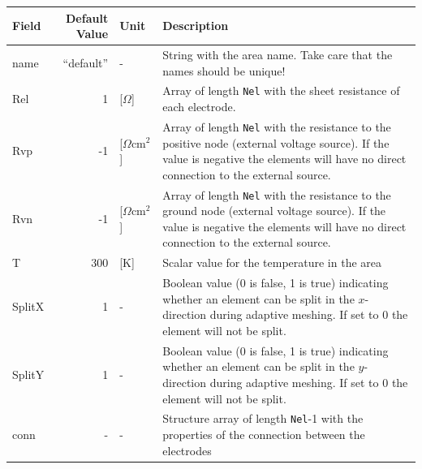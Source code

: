 \documentclass[noshowpacs,preprintnumbers,amsmath,amssymb, letter]{revtex4}
\begin{document}
\begin{table}[H]
\caption{\label{areadefstruct}The fields in the area definition struct}
\begin{longtable}{lrlp{}}
Field & Default Value & Unit & Description\\
\hline
name 	& ``default'' 	& - 						& String with the area name. Take care that the names should be unique!\\
Rel	 	&  1 			& [$\Omega$] 				& Array of length \texttt{Nel} with the sheet resistance of each electrode.\\
Rvp	 	&  -1 			& [$\Omega \text{cm}^2$] 	& Array of length \texttt{Nel} with the resistance to the positive node (external voltage source). If the value is negative the elements will have no direct connection to the external source.\\
Rvn	 	&  -1 			& [$\Omega \text{cm}^2$] 	& Array of length \texttt{Nel} with the resistance to the ground node (external voltage source). If the value is negative the elements will have no direct connection to the external source.\\
T		&	300			& [K]						& Scalar value for the temperature in the area\\
SplitX	&	1			& -							& Boolean value (0 is false, 1 is true) indicating whether an element can be split in the $x$-direction during adaptive meshing. If set to 0 the element will not be split.\\
SplitY	&	1			& -							& Boolean value (0 is false, 1 is true) indicating whether an element can be split in the $y$-direction during adaptive meshing. If set to 0 the element will not be split.\\
conn	&	-			& -							& Structure array of length \texttt{Nel}-1 with the properties of the connection between the electrodes
\end{longtable}


\end{table}
\end{document}
